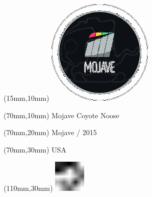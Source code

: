\null\newpage
\begin{textblock*}{50mm}(15mm,10mm)%
\includegraphics[width=50mm]{LG/MOJ.png}
\end{textblock*}
\begin{textblock*}{130mm}(70mm,10mm)%
{\fontsize{20}{20}\selectfont Mojave Coyote Noose}\\
\end{textblock*}
\begin{textblock*}{120mm}(70mm,20mm)%
{\fontsize{16}{16}\selectfont Mojave / 2015}\\
\end{textblock*}
\begin{textblock*}{120mm}(70mm,30mm)%
{\fontsize{12}{12}\selectfont USA}
\end{textblock*}
\begin{textblock*}{30mm}(110mm,30mm)%
\centering
\includegraphics[height=15mm]{icons/fa-rotate-left.pdf}
\end{textblock*}
